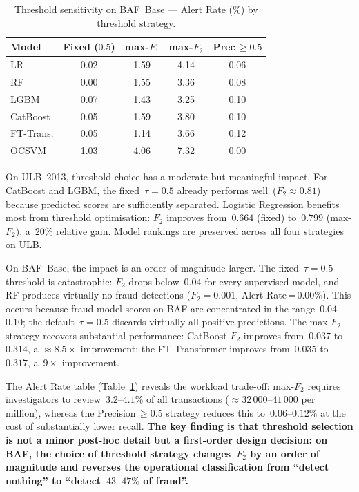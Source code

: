 \documentclass[a4paper,fleqn]{cas-sc}
\begin{document}
\begin{table}[ht!]
\centering
\caption{Threshold sensitivity on BAF~Base --- Alert Rate (\%) by threshold strategy.}
\label{tab:threshold_baf_alert}
\begin{tabular}{l c c c c}
\toprule
Model & Fixed ($0.5$) & max-$F_1$ & max-$F_2$ & Prec\,$\geq\!0.5$ \\
\midrule
LR         & 0.02 & 1.59 & 4.14 & 0.06 \\
RF         & 0.00 & 1.55 & 3.36 & 0.08 \\
LGBM       & 0.07 & 1.43 & 3.25 & 0.10 \\
CatBoost   & 0.05 & 1.59 & 3.80 & 0.10 \\
FT-Trans.  & 0.05 & 1.14 & 3.66 & 0.12 \\
OCSVM      & 1.03 & 4.06 & 7.32 & 0.00 \\
\bottomrule
\end{tabular}
\end{table}

On ULB~2013, threshold choice has a moderate but meaningful impact.
For CatBoost and LGBM, the fixed~$\tau=0.5$ already performs well~($F_2\!\approx\!0.81$)
because predicted scores are sufficiently separated.
Logistic Regression benefits most from threshold optimisation: $F_2$ improves from~$0.664$
(fixed) to~$0.799$ (max-$F_2$), a~$20\%$ relative gain.
Model rankings are preserved across all four strategies on ULB.

On BAF~Base, the impact is an order of magnitude larger.
The fixed~$\tau=0.5$ threshold is catastrophic: $F_2$ drops below~$0.04$ for every
supervised model, and RF produces virtually no fraud detections
($F_2\!=\!0.001$, Alert Rate\,=\,$0.00\%$).
This occurs because fraud model scores on BAF are concentrated in the range~$0.04$--$0.10$;
the default~$\tau=0.5$ discards virtually all positive predictions.
The max-$F_2$ strategy recovers substantial performance: CatBoost $F_2$ improves from~$0.037$
to~$0.314$, a ${\approx}8.5\times$ improvement; the FT-Transformer improves from~$0.035$
to~$0.317$, a~$9\times$ improvement.

The Alert Rate table (Table~\ref{tab:threshold_baf_alert}) reveals the workload
trade-off: max-$F_2$ requires investigators to review~$3.2$--$4.1\%$ of all transactions
(${\approx}32\,000$--$41\,000$ per million), whereas the Precision\,$\geq\!0.5$ strategy
reduces this to~$0.06$--$0.12\%$ at the cost of substantially lower recall.
\textbf{The key finding is that threshold selection is not a minor post-hoc detail but a
first-order design decision: on BAF, the choice of threshold strategy changes~$F_2$ by
an order of magnitude and reverses the operational classification from ``detect nothing''
to ``detect~$43$--$47\%$ of fraud''.}
\end{document}
